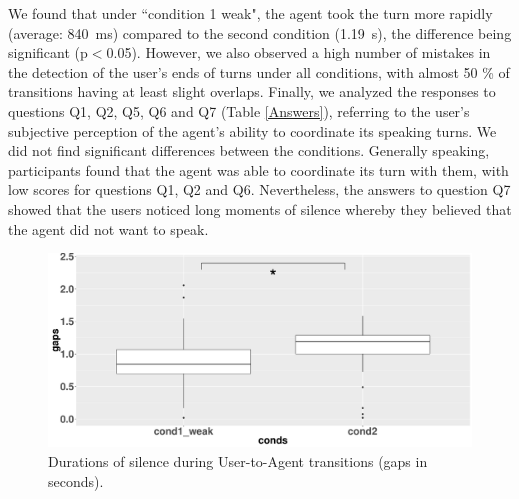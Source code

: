 \documentclass[twocolumn]{svjour3}
\begin{document}
We found that under ``condition 1 weak", the agent took the turn more rapidly (average: 840~ms) compared to the second condition (1.19~s), the difference being significant (p$<$0.05). However, we also observed a high number of mistakes in the detection of the user's ends of turns under all conditions, with almost 50 \% of transitions having at least slight overlaps.  
Finally, we analyzed the responses to questions Q1, Q2, Q5, Q6 and Q7 (Table \ref{Answers}), referring to the user's subjective perception of the agent's ability to coordinate its speaking turns. We did not find significant differences between the conditions. Generally speaking, participants found that the agent was able to coordinate its turn with them, with low scores for questions Q1, Q2 and Q6. 
Nevertheless, the answers to question Q7 showed that the users noticed long moments of silence whereby they believed that the agent did not want to speak. 
 
\begin{figure}
\centering
\includegraphics[width=\linewidth]{figure/boxTransitionsUA.pdf}
\caption{Durations of silence during User-to-Agent transitions (gaps in seconds).}
\label{box_ua}
\end{figure}
  
\end{document}
